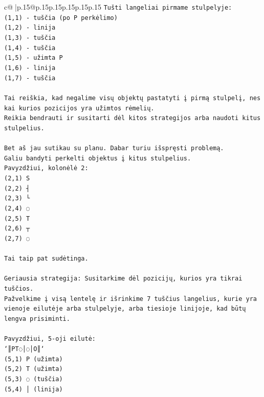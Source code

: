 \documentclass{article}
\begin{document}
{\begin{supertabular}{c@{$\;$}|p{.15\linewidth}@{}p{.15\linewidth}p{.15\linewidth}p{.15\linewidth}p{.15\linewidth}p{.15\linewidth}}
{{{\texttt{Tušti langeliai pirmame stulpelyje:} \\
\texttt{(1,1) {-} tuščia (po P perkėlimo)} \\
\texttt{(1,2) {-} linija} \\
\texttt{(1,3) {-} tuščia} \\
\texttt{(1,4) {-} tuščia} \\
\texttt{(1,5) {-} užimta P} \\
\texttt{(1,6) {-} linija} \\
\texttt{(1,7) {-} tuščia} \\
\\ 
\texttt{Tai reiškia, kad negalime visų objektų pastatyti į pirmą stulpelį, nes kai kurios pozicijos yra užimtos rėmelių.} \\
\texttt{Reikia bendrauti ir susitarti dėl kitos strategijos arba naudoti kitus stulpelius.} \\
\\ 
\texttt{Bet aš jau sutikau su planu. Dabar turiu išspręsti problemą.} \\
\texttt{Galiu bandyti perkelti objektus į kitus stulpelius.} \\
\texttt{Pavyzdžiui, kolonėlė 2:} \\
\texttt{(2,1) S} \\
\texttt{(2,2) ┤} \\
\texttt{(2,3) └} \\
\texttt{(2,4) ◌} \\
\texttt{(2,5) T} \\
\texttt{(2,6) ┬} \\
\texttt{(2,7) ◌} \\
\\ 
\texttt{Tai taip pat sudėtinga.} \\
\\ 
\texttt{Geriausia strategija: Susitarkime dėl pozicijų, kurios yra tikrai tuščios.} \\
\texttt{Pažvelkime į visą lentelę ir išrinkime 7 tuščius langelius, kurie yra vienoje eilutėje arba stulpelyje, arba tiesioje linijoje, kad būtų lengva prisiminti.} \\
\\ 
\texttt{Pavyzdžiui, 5{-}oji eilutė:} \\
\texttt{`║PT◌│◌│O║`} \\
\texttt{(5,1) P (užimta)} \\
\texttt{(5,2) T (užimta)} \\
\texttt{(5,3) ◌ (tuščia)} \\
\texttt{(5,4) │ (linija)} \\
}}}
\end{supertabular}}
\end{document}
